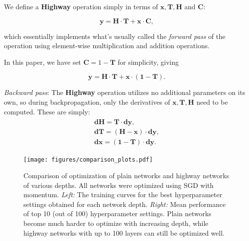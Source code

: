 \documentclass{article}
\renewcommand{\vec}[1]{\mathbf{#1}}
\begin{document}
We define a \textbf{Highway} operation simply in terms of $\vec{x}, \vec{T}, \vec{H}$ and $\vec{C}$:
 
\begin{equation}\label{eq:forward}
\vec{y} = \vec{H} \cdot \vec{T} + \vec{x} \cdot \vec{C},
\end{equation}

which essentially implements what's usually called the \emph{forward pass} of the operation using element-wise multiplication and addition operations.

In this paper, we have set $\vec{C} = 1 - \vec{T}$ for simplicity, giving

\begin{equation}\label{eq:forward-simple}
\vec{y} = \vec{H} \cdot \vec{T} + \vec{x} \cdot (\mathbf{1} - \vec{T}).
\end{equation}

\emph{Backward pass}: The \textbf{Highway} operation utilizes no additional parameters on its own, so during backpropagation, only the derivatives of $\vec{x}, \vec{T}, \vec{H}$ need to be computed. These are simply:
\begin{align}
\label{eqn:backward}
\begin{split}
\vec{dH} = \vec{T} \cdot \vec{dy},
\\
\vec{dT} = (\vec{H} - \vec{x}) \cdot \vec{dy},
\\
\vec{dx} = (\mathbf{1} - \vec{T}) \cdot \vec{dy}.
\end{split}
\end{align}

\begin{sidewaysfigure}
\texttt{[image: figures/comparison\_plots.pdf]}
\caption{Comparison of optimization of plain networks and highway networks of various depths. All networks were optimized using SGD with momentum. \textit{Left:} The training curves for the best hyperparameter settings obtained for each network depth. \textit{Right:} Mean performance of top 10 (out of 100) hyperparameter settings. Plain networks become much harder to optimize with increasing depth, while highway networks with up to 100 layers can still be optimized well.}
\label{fig:mnist-convergence-full}
\end{sidewaysfigure}
\end{document}
